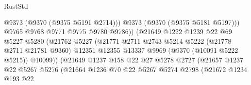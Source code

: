 \begin{lexlean}{RustStd}
\begin{coremodule}
                                            @9373
                                            (@9370 (@9375 @5191 @2714)))
                                          @9373
                                          (@9370 (@9375 @5181 @5197)))
                                        @9765
                                        @9768
                                        @9771
                                        @9775
                                        @9780
                                        @9786))
                                    (@21649
                                      @1222
                                      @1239
                                      @22
                                      @69
                                      @5227
                                      @5280
                                      (@21762
                                        @5227
                                        (@21771
                                          @2711
                                          @2743
                                          @5214
                                          @5222
                                          (@21778 @2711 @21781 @9360)
                                          @12351
                                          @12355
                                          @13337
                                          @9969
                                          (@9370 (@10091 @5222 @5215))
                                          @10099))
                                      (@21649
                                        @1237
                                        @158
                                        @22
                                        @27
                                        @5278
                                        @2727
                                        (@21657
                                          @1237
                                          @22
                                          @5267
                                          @5276
                                          (@21664
                                            @1236
                                            @70
                                            @22
                                            @5267
                                            @5274
                                            @2798
                                            (@21672
                                              @1234
                                              @193
                                              @22

\end{coremodule}
\end{lexlean}
